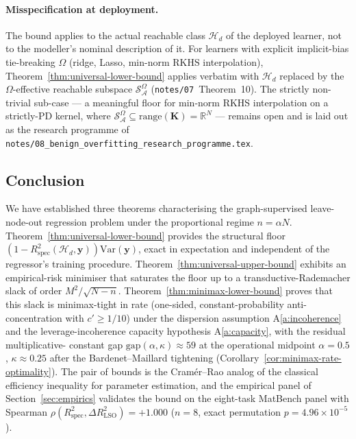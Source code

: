 \documentclass[11pt,a4paper]{article}
\theoremstyle{plain}
\theoremstyle{definition}
\theoremstyle{remark}
\newcommand{\by}{\mathbf{y}}
\newcommand{\bK}{\mathbf{K}}
\newcommand{\R}{\mathbb{R}}
\newcommand{\Var}{\mathrm{Var}}
\newcommand{\Rspec}{R^2_{\mathrm{spec}}}
\newcommand{\Scal}{\mathcal{S}}
\newcommand{\Acal}{\mathcal{A}}
\newcommand{\Hcal}{\mathcal{H}}
\begin{document}
\paragraph{Misspecification at deployment.}
The bound applies to the actual reachable class $\Hcal_d$ of the
deployed learner, not to the modeller's nominal description of it.
For learners with explicit implicit-bias tie-breaking $\Omega$
(ridge, Lasso, min-norm RKHS interpolation),
Theorem~\ref{thm:universal-lower-bound} applies verbatim with
$\Hcal_d$ replaced by the $\Omega$-effective reachable subspace
$\Scal_\Acal^\Omega$ (\texttt{notes/07}~Theorem~10). The strictly
non-trivial sub-case --- a meaningful floor for min-norm RKHS
interpolation on a strictly-PD kernel, where $\Scal_\Acal^\Omega
\subseteq \mathrm{range}(\bK) = \R^N$ --- remains open and is laid
out as the research programme of
\texttt{notes/08\_benign\_overfitting\_research\_programme.tex}.

\subsection{Conclusion}
\label{subsec:conclusion}

We have established three theorems characterising the
graph-supervised leave-node-out regression problem under the
proportional regime $n = \alpha N$.
Theorem~\ref{thm:universal-lower-bound} provides the structural
floor $(1 - \Rspec(\Hcal_d, \by))\Var(\by)$, exact in expectation
and independent of the regressor's training procedure.
Theorem~\ref{thm:universal-upper-bound} exhibits an empirical-risk
minimiser that saturates the floor up to a transductive-Rademacher
slack of order $M^2/\sqrt{N - n}$.
Theorem~\ref{thm:minimax-lower-bound} proves that this slack is
minimax-tight in rate (one-sided, constant-probability anti-%
concentration with $c' \ge 1/10$) under the dispersion assumption
A\ref{a:incoherence} and the leverage-incoherence capacity
hypothesis A\ref{a:capacity}, with the residual multiplicative-%
constant gap $\mathrm{gap}(\alpha, \kappa) \approx 59$ at the
operational midpoint $\alpha = 0.5$, $\kappa \approx 0.25$ after
the Bardenet--Maillard tightening
(Corollary~\ref{cor:minimax-rate-optimality}).
The pair of bounds is the Cram\'er--Rao analog of the classical
efficiency inequality for parameter estimation, and the empirical
panel of Section~\ref{sec:empirics} validates the bound on the
eight-task MatBench panel with Spearman $\rho(\Rspec, \Delta
R^2_{\mathrm{LSO}}) = +1.000$ ($n = 8$, exact permutation $p = 4.96
\times 10^{-5}$).
\end{document}
